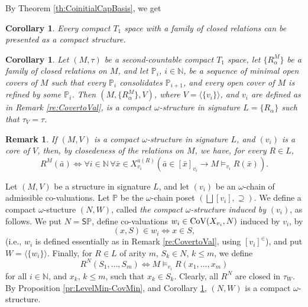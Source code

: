 \documentclass[12pt]{amsart}
\theoremstyle{plain}
\newtheorem{corollary}[theorem]{\bf Corollary}
\newtheorem{remark}[theorem]{\bf Remark}
\newcommand \Val{{\rm{CoV}}}
\newcommand \Sp{{\mathsf{S}}}
\newcommand \NN{\mathbb{N}}
\newcommand \PPb{\mathbb{P}}
\begin{document}
By Theorem \ref{th:CoinitialCapBasis}, we get
\begin{corollary}
\label{co:CompactAreStructures}
Every compact $T_1$ space with a family of closed relations can be presented as a compact structure.
\end{corollary}

\begin{corollary}
\label{co:SCCompactAreO-Structures}
Let $(M,\tau)$ be a second-countable compact $T_1$ space, let $\{R^M_\alpha\}$ be a family of closed relations on $M$, and let $\PPb_i$, $i \in \NN$, be a sequence of minimal open covers of $M$ such that every $\PPb_i$ consolidates $\PPb_{i+1}$, and every open cover of $M$ is refined by some $\PPb_i$. Then $(M,\{R^M_\alpha\},V)$, where $V=\langle \{v_i\} \rangle$, and $v_i$ are defined as in Remark \ref{re:CovertoVal}, is a compact $\omega$-structure in signature $L=\{R_\alpha\}$ such that $\tau_V=\tau$.
\end{corollary}


\begin{remark}
If $(M,V)$ is a compact $\omega$-structure in signature $L$, and $(v_i) $ is a core of $V$, then, by closedeness of the relations on $M$, we have, for every $R \in L$,
%
\[R^{M}(\bar{a}) \iff \forall i \in \NN \, \forall \bar{x} \in X^{a(R)}_{v_i} (\bar{a} \in [\bar{x}]_{v_i} \rightarrow M\models_{v_i} R(\bar{x})).\]
\end{remark}

Let $(M,V)$ be a structure in signature $L$, and let $(v_i) $ be an $\omega$-chain of  admissible co-valuations. Let $\PPb$ be the $\omega$-chain poset $(\bigsqcup [v_i], \supseteq)$. %
%
%
We define a compact $\omega$-stucture $(N,W)$, called \emph{the compact $\omega$-structure induced by} $(v_i)$, as follows. We put $N=\Sp \PPb$, define co-valuations $w_i \in \Val(X_{v_i},N)$ induced by $v_i$, by $$(x,S) \in w_i \iff x \in S,$$ (i.e., $w_i$ is defined essentially as in Remark \ref{re:CovertoVal}, using $[v_i]^\in$), and put $W=\langle \{w_i\} \rangle$. Finally, for $R \in L$ of arity $m$, $S_k \in N$, $k \leq m$, we define 
%
\[R^{N}(S_1, \ldots, S_m) \iff M \models_{v_i} R(x_1, \ldots, x_m)\]
%
for all $i \in \NN$, and $x_k$, $k \leq m$, such that $x_k \in S_k$. Clearly, all $R^N$ are closed in $\tau_W$. By Proposition \ref{pr:LevelMin-CovMin}, and Corollary \ref{co:SCCompactAreO-Structures}, $(N,W)$ is a compact $\omega$-structure.
\end{document}
